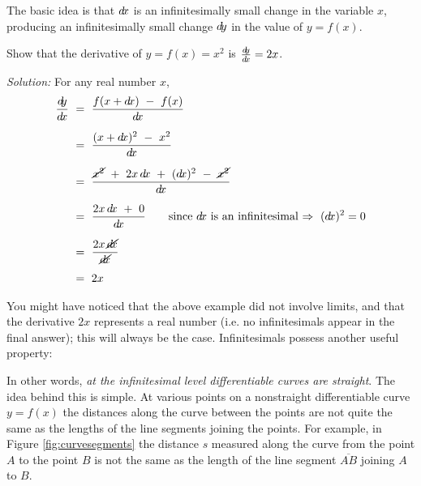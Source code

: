 The basic idea is that $d\!x$ is an infinitesimally small change in the variable
$x$, producing an infinitesimally small change $d\!y$ in the value of $y=f(x)$.
\begin{exmp}
 Show that the derivative of $y=f(x)=x^2$ is $\frac{d\negmedspace y}{d\!x} = 2x$.\vspace{1mm}
 \par\noindent\emph{Solution:} For any real number $x$,
 \begin{align*}
  \dydx ~&=~ \frac{f(x+\dx) ~-~ f(x)}{\dx}\\[6pt]
  &=~ \frac{(x+\dx)^2 ~-~ x^2}{\dx}\\[6pt]
  &=~ \frac{\cancel{x^2} ~+~ 2x\,\dx ~+~ (\dx)^2 ~-~ \cancel{x^2}}{\dx}\\[6pt]
  &=~ \frac{2x\,\dx ~+~ 0}{\dx}\qquad\text{since $\dx$ is an
   infinitesimal $\Rightarrow ~(\dx)^2 = 0$}\\[6pt]
  &=~ \frac{2x\,\cancel{\dx}}{\cancel{\dx}}\\[4pt]
  &=~ 2x
 \end{align*}
\end{exmp}
\divider
\newpage
You might have noticed that the above example did not involve limits, and that
the derivative $2x$ represents a real number (i.e. no infinitesimals appear in
the final answer); this will always be the case. Infinitesimals possess another
useful property:


In other words, \emph{at the infinitesimal level differentiable curves are
straight}. The idea behind this is simple. At various points on a nonstraight
differentiable curve $y=f(x)$ the distances along the curve between the points
are not quite the same as the lengths of the line segments joining the points.
For example, in Figure \ref{fig:curvesegments} the distance $s$ measured along
the curve from the point $A$ to the point $B$ is not the same as the length of
the line segment $\overline{AB}$ joining $A$ to $B$.

